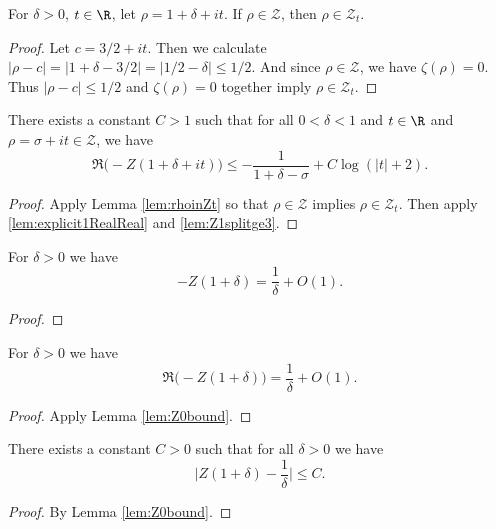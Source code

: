 \begin{lemma}[In set] \label{lem:rhoinZt}  \leanok
For $\delta>0$, $t\in\R$, let $\rho=1 + \delta + it$.
If $\rho \in \mathcal Z$, then $\rho \in \mathcal Z_t$.
\end{lemma}
\begin{proof}
\leanok
Let $c=3/2+it$.
Then we calculate $|\rho - c| = |1+\delta - 3/2| = |1/2-\delta| \le 1/2$.
And since $\rho\in \mathcal Z$, we have $\zeta(\rho)=0$. Thus $|\rho - c|\le1/2$ and $\zeta(\rho)=0$ together imply $\rho\in\mathcal{Z}_t$.
\end{proof}

\begin{lemma}\label{lem:Z1bound}  \leanok
There exists a constant $C>1$ such that for all $0<\delta<1$ and $t\in\R$ and $\rho=\sigma+it\in \mathcal Z$, we have
\[ \Re\Big(-Z(1+\delta+it)\Big) \le -\frac{1}{1+\delta-\sigma} + C\log(|t|+2).\]
\end{lemma}
\begin{proof} 
\leanok
Apply Lemma \ref{lem:rhoinZt} so that $\rho\in \mathcal Z$ implies $\rho\in \mathcal Z_t$. Then apply \ref{lem:explicit1RealReal} and \ref{lem:Z1splitge3}.
\end{proof}


\begin{lemma}[At one]\label{lem:Z0bound}  \leanok
For $\delta>0$ we have
\[ -Z(1+\delta) = \frac{1}{\delta} + O(1). \]
\end{lemma}
\begin{proof} \leanok
\end{proof}

\begin{lemma}\label{lem:Z0boundRe}  \leanok
For $\delta>0$ we have
\[ \Re\Big(-Z(1+\delta)\Big) = \frac{1}{\delta} + O(1). \]
\end{lemma}
\begin{proof} \leanok {}
Apply Lemma \ref{lem:Z0bound}.
\end{proof}

\begin{lemma} \label{lem:Z0bound_const}  \leanok
There exists a constant $C>0$ such that for all $\delta>0$ we have
\[ \Big|Z(1+\delta) - \frac{1}{\delta}\Big| \le C. \]
\end{lemma}
\begin{proof}
\leanok
By Lemma \ref{lem:Z0bound}.
\end{proof}

